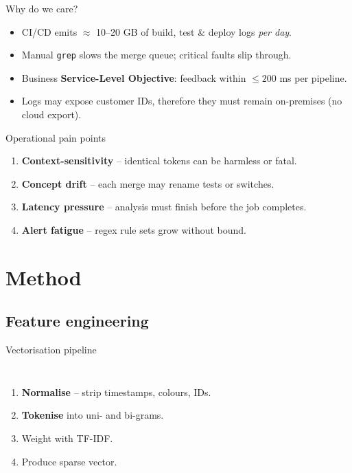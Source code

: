 \documentclass[15pt,aspectratio=169]{beamer}
\newcommand{\tfidf}{TF-IDF\xspace}
\begin{document}
\begin{frame}{Why do we care?}
\begin{itemize}[<+->]
  \item CI/CD emits \alert{$\approx$ 10--20 GB} of build, test \& deploy logs \textit{per day}.
  \item Manual \texttt{grep} slows the merge queue; critical faults slip through.
  \item Business \textbf{Service-Level Objective}: feedback within \alert{$\le 200$ ms} per pipeline.
  \item Logs may expose customer IDs, therefore they must remain on-premises (no cloud export).
\end{itemize}
\end{frame}

\begin{frame}{Operational pain points}
\begin{enumerate}[<+->]
  \item \textbf{Context-sensitivity} -- identical tokens can be harmless or fatal.
  \item \textbf{Concept drift} -- each merge may rename tests or switches.
  \item \textbf{Latency pressure} -- analysis must finish before the job completes.
  \item \textbf{Alert fatigue} -- regex rule sets grow without bound.
\end{enumerate}
\end{frame}

\section{Method}

\subsection{Feature engineering}
\begin{frame}{Vectorisation pipeline }
\begin{columns}
    \begin{enumerate}[<+->]
      \item \textbf{Normalise} -- strip timestamps, colours, IDs.
      \item \textbf{Tokenise} into uni- and bi-grams.
      \item Weight with \tfidf.
      \item Produce sparse vector.
    \end{enumerate}
    \centering
\end{columns}
\end{frame}
\end{document}
